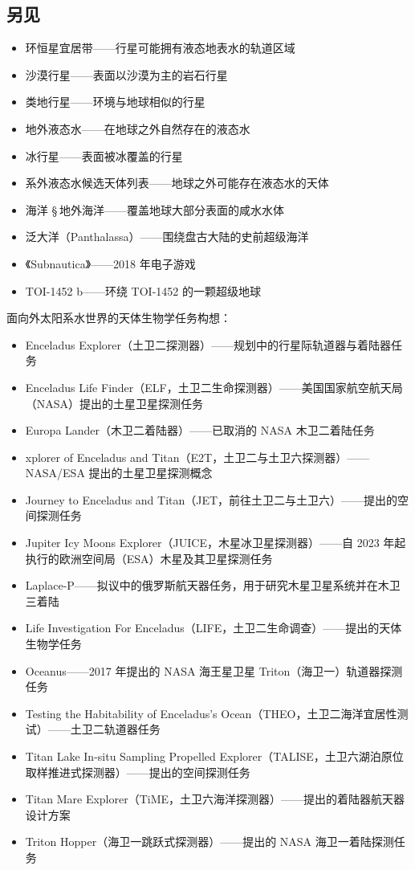 \subsection{另见}
\begin{itemize}
\item 环恒星宜居带——行星可能拥有液态地表水的轨道区域
\item 沙漠行星——表面以沙漠为主的岩石行星
\item 类地行星——环境与地球相似的行星
\item 地外液态水——在地球之外自然存在的液态水
\item 冰行星——表面被冰覆盖的行星
\item 系外液态水候选天体列表——地球之外可能存在液态水的天体
\item 海洋 § 地外海洋——覆盖地球大部分表面的咸水水体
\item 泛大洋（Panthalassa）——围绕盘古大陆的史前超级海洋
\item 《Subnautica》——2018 年电子游戏
\item TOI-1452 b——环绕 TOI-1452 的一颗超级地球
\end{itemize}
面向外太阳系水世界的天体生物学任务构想：

\begin{itemize}
\item Enceladus Explorer（土卫二探测器）——规划中的行星际轨道器与着陆器任务
\item Enceladus Life Finder（ELF，土卫二生命探测器）——美国国家航空航天局（NASA）提出的土星卫星探测任务
\item Europa Lander（木卫二着陆器）——已取消的 NASA 木卫二着陆任务
\item xplorer of Enceladus and Titan（E2T，土卫二与土卫六探测器）——NASA/ESA 提出的土星卫星探测概念
\item Journey to Enceladus and Titan（JET，前往土卫二与土卫六）——提出的空间探测任务
\item Jupiter Icy Moons Explorer（JUICE，木星冰卫星探测器）——自 2023 年起执行的欧洲空间局（ESA）木星及其卫星探测任务
\item Laplace-P——拟议中的俄罗斯航天器任务，用于研究木星卫星系统并在木卫三着陆
\item Life Investigation For Enceladus（LIFE，土卫二生命调查）——提出的天体生物学任务
\item Oceanus——2017 年提出的 NASA 海王星卫星 Triton（海卫一）轨道器探测任务
\item Testing the Habitability of Enceladus's Ocean（THEO，土卫二海洋宜居性测试）——土卫二轨道器任务
\item Titan Lake In-situ Sampling Propelled Explorer（TALISE，土卫六湖泊原位取样推进式探测器）——提出的空间探测任务
\item Titan Mare Explorer（TiME，土卫六海洋探测器）——提出的着陆器航天器设计方案
\item Triton Hopper（海卫一跳跃式探测器）——提出的 NASA 海卫一着陆探测任务
\end{itemize}
